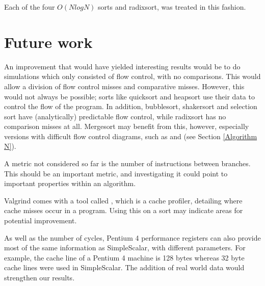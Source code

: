 Each of the four $O(NlogN)$ sorts and radixsort, was treated in this fashion.

\section{Future work}
An improvement that would have yielded interesting results would be to do simulations
which only consisted of flow control, with no comparisons. This would allow a
division of flow control misses and comparative misses. However, this would not
always be possible; sorts like quicksort and heapsort use their data to
control the flow of the program. In addition, bubblesort, shakersort and
selection sort have (analytically) predictable flow control, while radixsort has
no comparison misses at all. Mergesort may benefit from this, however, especially versions
with difficult flow control diagrams, such as  and  (see Section \ref{Algorithm N}).

A metric not considered so far is the number of instructions between branches.
This should be an important metric, and investigating it could point to
important properties within an algorithm.

Valgrind comes with a tool called , which is a cache
profiler, detailing where cache misses occur in a program. Using this on a
sort may indicate areas for potential improvement.

As well as the number of cycles, Pentium 4 performance registers can also provide
most of the same information as SimpleScalar, with different parameters. For
example, the cache line of a Pentium 4 machine is 128 bytes whereas 32 byte
cache lines were used in SimpleScalar. The addition of real world data would
strengthen our results.
